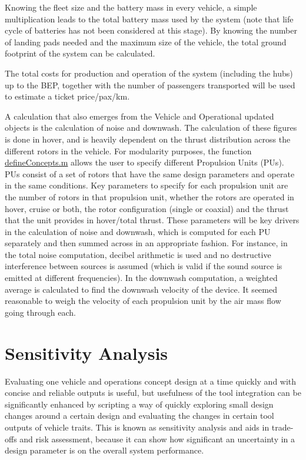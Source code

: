 Knowing the fleet size and the battery mass in every vehicle, a simple multiplication leads to the total battery mass used by the system (note that life cycle of batteries has not been considered at this stage). By knowing the number of landing pads needed and the maximum size of the vehicle, the total ground footprint of the system can be calculated. 

The total costs for production and operation of the system (including the hubs) up to the BEP, together with the number of passengers transported will be used to estimate a ticket price/pax/km.

A calculation that also emerges from the Vehicle and Operational updated objects is the calculation of noise and downwash. The calculation of these figures is done in hover, and is heavily dependent on the thrust distribution across the different rotors in the vehicle. For modularity purposes, the function \url{defineConcepts.m} allows the user to specify different Propulsion Units (PUs). PUs consist of a set of rotors that have the same design parameters and operate in the same conditions. Key parameters to specify for each propulsion unit are the number of rotors in that propulsion unit, whether the rotors are operated in hover, cruise or both, the rotor configuration (single or coaxial) and the thrust that the unit provides in hover/total thrust. These parameters will be key drivers in the calculation of noise and downwash, which is computed for each PU separately and then summed across in an appropriate fashion. For instance, in the total noise computation, decibel arithmetic is used and no destructive interference between sources is assumed (which is valid if the sound source is emitted at different frequencies). In the downwash computation, a weighted average is calculated to find the downwash velocity of the device. It seemed reasonable to weigh the velocity of each propulsion unit by the air mass flow going through each.








\section{Sensitivity Analysis} 
\label{sec:sensitivityanalysis}

Evaluating one vehicle and operations concept design at a time quickly and with concise and reliable outputs is useful, but usefulness of the tool integration can be significantly enhanced by scripting a way of quickly exploring small design changes around a certain design and evaluating the changes in certain tool outputs of vehicle traits. This is known as sensitivity analysis and aids in trade-offs and risk assessment, because it can show how significant an uncertainty in a design parameter is on the overall system performance.

